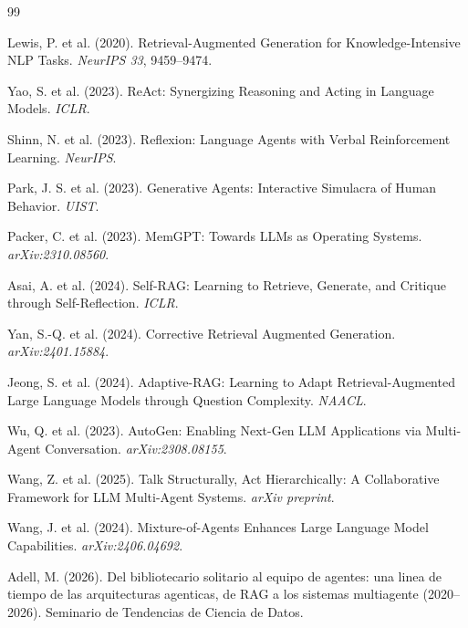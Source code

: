 \documentclass[11pt]{article}
\begin{document}
\begin{thebibliography}{99}

 Lewis, P. et al. (2020). Retrieval-Augmented Generation
for Knowledge-Intensive NLP Tasks. \emph{NeurIPS 33}, 9459--9474.

 Yao, S. et al. (2023). ReAct: Synergizing Reasoning and
Acting in Language Models. \emph{ICLR}.

 Shinn, N. et al. (2023). Reflexion: Language Agents with
Verbal Reinforcement Learning. \emph{NeurIPS}.

 Park, J. S. et al. (2023). Generative Agents: Interactive
Simulacra of Human Behavior. \emph{UIST}.

 Packer, C. et al. (2023). MemGPT: Towards LLMs as
Operating Systems. \emph{arXiv:2310.08560}.

 Asai, A. et al. (2024). Self-RAG: Learning to Retrieve,
Generate, and Critique through Self-Reflection. \emph{ICLR}.

 Yan, S.-Q. et al. (2024). Corrective Retrieval Augmented
Generation. \emph{arXiv:2401.15884}.

 Jeong, S. et al. (2024). Adaptive-RAG: Learning to Adapt
Retrieval-Augmented Large Language Models through Question Complexity.
\emph{NAACL}.

 Wu, Q. et al. (2023). AutoGen: Enabling Next-Gen LLM
Applications via Multi-Agent Conversation. \emph{arXiv:2308.08155}.

 Wang, Z. et al. (2025). Talk Structurally, Act
Hierarchically: A Collaborative Framework for LLM Multi-Agent Systems.
\emph{arXiv preprint}.

 Wang, J. et al. (2024). Mixture-of-Agents Enhances
Large Language Model Capabilities. \emph{arXiv:2406.04692}.

 Adell, M. (2026). Del bibliotecario solitario al
equipo de agentes: una linea de tiempo de las arquitecturas agenticas, de
RAG a los sistemas multiagente (2020--2026). Seminario de Tendencias de
Ciencia de Datos.

\end{thebibliography}
\end{document}
